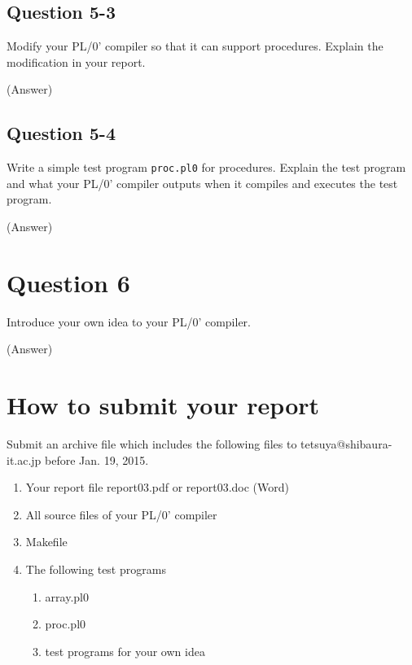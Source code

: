 \documentclass{article}
\begin{document}
\subsection*{Question 5-3}
Modify your PL/0' compiler so that it can support procedures.
Explain the modification in your report.

\ifreport
(Answer)\\
\fi


\subsection*{Question 5-4}
Write a simple test program {\tt proc.pl0} for procedures.
Explain the test program and what your PL/0' compiler outputs when it
compiles and executes the test program.


\ifreport
(Answer)\\
\fi



\newpage
\section*{Question 6}
Introduce your own idea to your PL/0' compiler.

\ifreport
(Answer)\\
\fi



\ifreport
\else
\section*{How to submit your report}
Submit an archive file which includes the following files to
tetsuya@shibaura-it.ac.jp before Jan. 19, 2015.
\begin{enumerate}
 \item Your report file report03.pdf or report03.doc (Word)
 \item All source files of your PL/0' compiler
 \item Makefile
 \item The following test programs
       \begin{enumerate}
	\item array.pl0
	\item proc.pl0
	\item test programs for your own idea
       \end{enumerate}
\end{enumerate}
\end{document}
